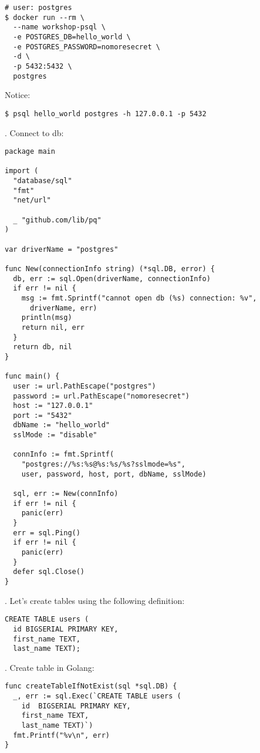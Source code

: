 \documentclass[11pt, letterpaper]{article}
\begin{document}
\begin{verbatim}
# user: postgres
$ docker run --rm \
  --name workshop-psql \
  -e POSTGRES_DB=hello_world \
  -e POSTGRES_PASSWORD=nomoresecret \
  -d \
  -p 5432:5432 \
  postgres
\end{verbatim}

Notice:

\begin{verbatim}
$ psql hello_world postgres -h 127.0.0.1 -p 5432
\end{verbatim}

\bigskip
3. Connect to db:

\begin{verbatim}
package main

import (
  "database/sql"
  "fmt"
  "net/url"

  _ "github.com/lib/pq"
)

var driverName = "postgres"

func New(connectionInfo string) (*sql.DB, error) {
  db, err := sql.Open(driverName, connectionInfo)
  if err != nil {
    msg := fmt.Sprintf("cannot open db (%s) connection: %v", 
      driverName, err)
    println(msg)
    return nil, err
  }
  return db, nil
}

func main() {
  user := url.PathEscape("postgres")
  password := url.PathEscape("nomoresecret")
  host := "127.0.0.1"
  port := "5432"
  dbName := "hello_world"
  sslMode := "disable"

  connInfo := fmt.Sprintf(
    "postgres://%s:%s@%s:%s/%s?sslmode=%s",
    user, password, host, port, dbName, sslMode)

  sql, err := New(connInfo)
  if err != nil {
    panic(err)
  }
  err = sql.Ping()
  if err != nil {
    panic(err)
  }
  defer sql.Close()
}
\end{verbatim}

. Let's create tables using the following definition:

\begin{verbatim}
CREATE TABLE users (
  id BIGSERIAL PRIMARY KEY,
  first_name TEXT,
  last_name TEXT);
\end{verbatim}

\bigskip
5. Create table in Golang:

\begin{verbatim}
func createTableIfNotExist(sql *sql.DB) {
  _, err := sql.Exec(`CREATE TABLE users (
    id  BIGSERIAL PRIMARY KEY,
    first_name TEXT,
    last_name TEXT)`)
  fmt.Printf("%v\n", err)
}
\end{verbatim}
\end{document}
